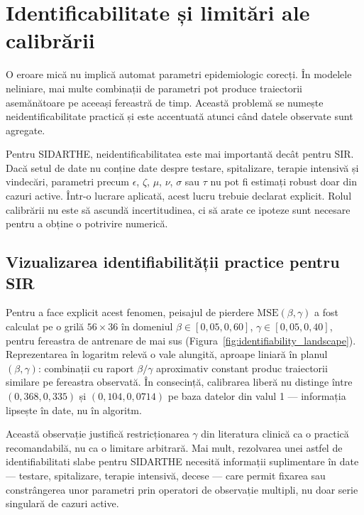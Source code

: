 \section{Identificabilitate și limitări ale calibrării}
\label{sec:identificabilitate}

O eroare mică nu implică automat parametri epidemiologic corecți. În modelele
neliniare, mai multe combinații de parametri pot produce traiectorii asemănătoare
pe aceeași fereastră de timp. Această problemă se numește neidentificabilitate
practică și este accentuată atunci când datele observate sunt agregate.

Pentru SIDARTHE, neidentificabilitatea este mai importantă decât pentru SIR.
Dacă setul de date nu conține date despre testare, spitalizare, terapie intensivă și
vindecări, parametri precum $\epsilon$, $\zeta$, $\mu$, $\nu$, $\sigma$ sau
$\tau$ nu pot fi estimați robust doar din cazuri active. Într-o lucrare aplicată,
acest lucru trebuie declarat explicit. Rolul calibrării nu este să ascundă
incertitudinea, ci să arate ce ipoteze sunt necesare pentru a obține o potrivire
numerică.

\subsection{Vizualizarea identifiabilității practice pentru SIR}
\label{subsec:identif_landscape}

Pentru a face explicit acest fenomen, peisajul de pierdere
$\mathrm{MSE}(\beta, \gamma)$ a fost calculat pe o grilă $56 \times 36$ în
domeniul $\beta \in [0{,}05, 0{,}60]$, $\gamma \in [0{,}05, 0{,}40]$, pentru
fereastra de antrenare de mai sus
(Figura~\ref{fig:identifiability_landscape}). Reprezentarea în logaritm
relevă o vale alungită, aproape liniară în planul $(\beta, \gamma)$:
combinații cu raport $\beta/\gamma$ aproximativ constant produc traiectorii
similare pe fereastra observată. În consecință, calibrarea liberă nu
distinge între $(0{,}368, 0{,}335)$ și $(0{,}104, 0{,}0714)$ pe baza datelor
din valul 1 — informația lipsește în date, nu în algoritm.



Această observație justifică restricționarea $\gamma$ din literatura clinică
ca o practică recomandabilă, nu ca o limitare arbitrară. Mai mult, rezolvarea
unei astfel de identifiabilitati slabe pentru SIDARTHE necesită informații
suplimentare în date — testare, spitalizare, terapie intensivă, decese — care
permit fixarea sau constrângerea unor parametri prin operatori de observație
multipli, nu doar serie singulară de cazuri active.

